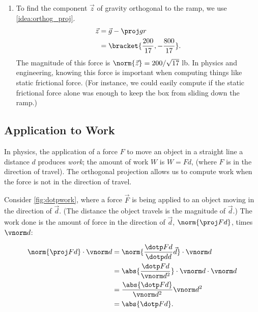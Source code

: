 \begin{example}
\begin{enumerate}
	\item		To find the component $\vec z$ of gravity orthogonal to the ramp, we use \autoref{idea:orthog_proj}.
	\begin{align*}
	\vec z &= \vec g - \proj gr \\
	&=\bracket{\frac{200}{17},-\frac{800}{17}}%
	.
	\end{align*}
	The magnitude of this force is $\norm{\vec z}=200/\sqrt{17}%
	$ lb. In physics and engineering, knowing this force is important when computing things like static frictional force. (For instance, we could easily compute if the static frictional force alone was enough to keep the box from sliding down the ramp.)
\end{enumerate}
\end{example}

\subsection{Application to Work}

In physics, the application of a force $F$ to move an object in a straight line a distance $d$ produces \emph{work}; the amount of work $W$ is $W=Fd$, (where $F$ is in the direction of travel). The orthogonal projection allows us to compute work when the force is not in the direction of travel.

Consider \autoref{fig:dotpwork}, where a force $\vec F$ is being applied to an object moving in the direction of $\vec d$. (The distance the object travels is the magnitude of $\vec d$.) The work done is the amount of force in the direction of $\vec d$, $\norm{\proj Fd}$, times $\vnorm d$:


\begin{align*}
\norm{\proj Fd}\cdot\vnorm d
 &= \norm{\frac{\dotp Fd}{\dotp dd}\vec d}\cdot \vnorm d \\
		&= \abs{\frac{\dotp Fd}{\vnorm d^2}}\cdot \vnorm d\cdot\vnorm d\\
		&= \frac{\abs{\dotp Fd}}{\vnorm d^2}\vnorm d^2\\
		&= \abs{\dotp Fd}.
\end{align*}

